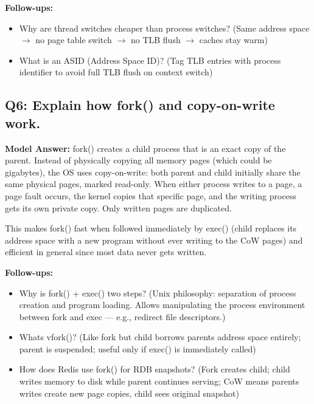 \documentclass[11pt]{article}
\providecommand{\tightlist}{\setlength{\itemsep}{1pt}\setlength{\parskip}{0pt}}
\begin{document}
\textbf{Follow-ups:}

\begin{itemize}
\tightlist
\item
  Why are thread switches cheaper than process switches? (Same address space \(\rightarrow\) no page table switch \(\rightarrow\) no TLB flush \(\rightarrow\) caches stay warm)
\item
  What is an ASID (Address Space ID)? (Tag TLB entries with process identifier to avoid full TLB flush on context switch)
\end{itemize}

\subsection{Q6: Explain how fork() and copy-on-write work.}\label{q6-explain-how-fork-and-copy-on-write-work}

\textbf{Model Answer:} fork() creates a child process that is an exact copy of the parent. Instead of physically copying all memory pages (which could be gigabytes), the OS uses copy-on-write: both parent and child initially share the same physical pages, marked read-only. When either process writes to a page, a page fault occurs, the kernel copies that specific page, and the writing process gets its own private copy. Only written pages are duplicated.

This makes fork() fast when followed immediately by exec() (child replaces its address space with a new program without ever writing to the CoW pages) and efficient in general since most data never gets written.

\textbf{Follow-ups:}

\begin{itemize}
\tightlist
\item
  Why is fork() + exec() two steps? (Unix philosophy: separation of process creation and program loading. Allows manipulating the process environment between fork and exec --- e.g., redirect file descriptors.)
\item
  What\textquotesingle s vfork()? (Like fork but child borrows parent\textquotesingle s address space entirely; parent is suspended; useful only if exec() is immediately called)
\item
  How does Redis use fork() for RDB snapshots? (Fork creates child; child writes memory to disk while parent continues serving; CoW means parent\textquotesingle s writes create new page copies, child sees original snapshot)
\end{itemize}
\end{document}
